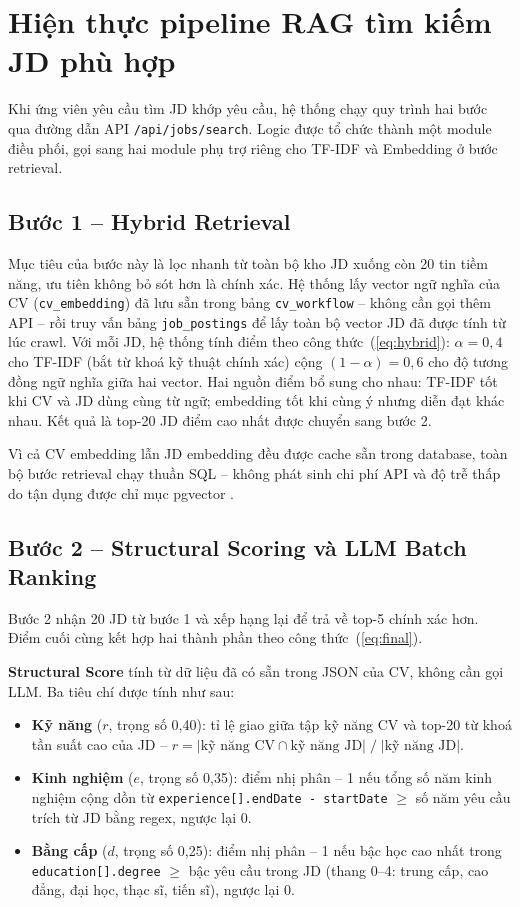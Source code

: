 \documentclass[../DoAn.tex]{subfiles}
\begin{document}
\section{Hiện thực pipeline RAG tìm kiếm JD phù hợp}
\label{sec:rag_impl}

Khi ứng viên yêu cầu tìm JD khớp yêu cầu, hệ thống chạy quy trình hai bước qua đường dẫn API \texttt{/api/jobs/search}. Logic được tổ chức thành một module điều phối, gọi sang hai module phụ trợ riêng cho TF-IDF và Embedding ở bước retrieval.

\subsection{Bước 1 -- Hybrid Retrieval}

Mục tiêu của bước này là lọc nhanh từ toàn bộ kho JD xuống còn 20 tin tiềm năng, ưu tiên không bỏ sót hơn là chính xác. Hệ thống lấy vector ngữ nghĩa của CV (\texttt{cv\_embedding}) đã lưu sẵn trong bảng \texttt{cv\_workflow} -- không cần gọi thêm API -- rồi truy vấn bảng \texttt{job\_postings} để lấy toàn bộ vector JD đã được tính từ lúc crawl. Với mỗi JD, hệ thống tính điểm theo công thức~(\ref{eq:hybrid}): $\alpha = 0{,}4$ cho TF-IDF (bắt từ khoá kỹ thuật chính xác) cộng $(1-\alpha) = 0{,}6$ cho độ tương đồng ngữ nghĩa giữa hai vector. Hai nguồn điểm bổ sung cho nhau: TF-IDF tốt khi CV và JD dùng cùng từ ngữ; embedding tốt khi cùng ý nhưng diễn đạt khác nhau. Kết quả là top-20 JD điểm cao nhất được chuyển sang bước 2.

Vì cả CV embedding lẫn JD embedding đều được cache sẵn trong database, toàn bộ bước retrieval chạy thuần SQL -- không phát sinh chi phí API và độ trễ thấp do tận dụng được chỉ mục pgvector \cite{pgvector2024}.

\subsection{Bước 2 -- Structural Scoring và LLM Batch Ranking}

Bước 2 nhận 20 JD từ bước 1 và xếp hạng lại để trả về top-5 chính xác hơn. Điểm cuối cùng kết hợp hai thành phần theo công thức~(\ref{eq:final}).

\textbf{Structural Score} tính từ dữ liệu đã có sẵn trong JSON của CV, không cần gọi LLM. Ba tiêu chí được tính như sau:

\begin{itemize}
  \item \textbf{Kỹ năng} ($r$, trọng số 0,40): tỉ lệ giao giữa tập kỹ năng CV và top-20 từ khoá tần suất cao của JD -- $r = |\text{kỹ năng CV} \cap \text{kỹ năng JD}| \;/\; |\text{kỹ năng JD}|$.
  \item \textbf{Kinh nghiệm} ($e$, trọng số 0,35): điểm nhị phân -- 1 nếu tổng số năm kinh nghiệm cộng dồn từ \texttt{experience[].endDate - startDate} $\geq$ số năm yêu cầu trích từ JD bằng regex, ngược lại 0.
  \item \textbf{Bằng cấp} ($d$, trọng số 0,25): điểm nhị phân -- 1 nếu bậc học cao nhất trong \texttt{education[].degree} $\geq$ bậc yêu cầu trong JD (thang 0--4: trung cấp, cao đẳng, đại học, thạc sĩ, tiến sĩ), ngược lại 0.
\end{itemize}
\end{document}
